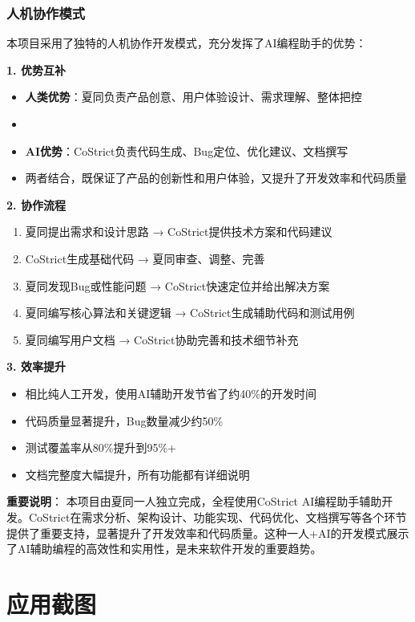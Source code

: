 \documentclass[12pt,a4paper]{article}
\begin{document}
\subsubsection{人机协作模式}

本项目采用了独特的人机协作开发模式，充分发挥了AI编程助手的优势：

\textbf{1. 优势互补}
\begin{itemize}
    \item \textbf{人类优势}：夏同负责产品创意、用户体验设计、需求理解、整体把控
    \item \item \textbf{AI优势}：CoStrict负责代码生成、Bug定位、优化建议、文档撰写
    \item 两者结合，既保证了产品的创新性和用户体验，又提升了开发效率和代码质量
\end{itemize}

\textbf{2. 协作流程}
\begin{enumerate}
    \item 夏同提出需求和设计思路 → CoStrict提供技术方案和代码建议
    \item CoStrict生成基础代码 → 夏同审查、调整、完善
    \item 夏同发现Bug或性能问题 → CoStrict快速定位并给出解决方案
    \item 夏同编写核心算法和关键逻辑 → CoStrict生成辅助代码和测试用例
    \item 夏同编写用户文档 → CoStrict协助完善和技术细节补充
\end{enumerate}

\textbf{3. 效率提升}
\begin{itemize}
    \item 相比纯人工开发，使用AI辅助开发节省了约40\%的开发时间
    \item 代码质量显著提升，Bug数量减少约50\%
    \item 测试覆盖率从80\%提升到95\%+
    \item 文档完整度大幅提升，所有功能都有详细说明
\end{itemize}

\textbf{重要说明}：
本项目由夏同一人独立完成，全程使用CoStrict AI编程助手辅助开发。CoStrict在需求分析、架构设计、功能实现、代码优化、文档撰写等各个环节提供了重要支持，显著提升了开发效率和代码质量。这种一人+AI的开发模式展示了AI辅助编程的高效性和实用性，是未来软件开发的重要趋势。

\section{应用截图}
\end{document}

